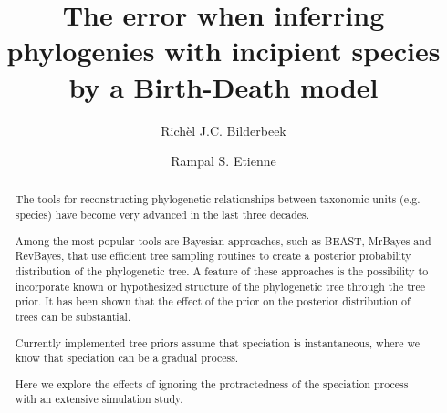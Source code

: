 \documentclass{article}
\title{The error when inferring phylogenies with incipient species by a Birth-Death model}
\author[1]{Rich\`el J.C. Bilderbeek}
\author[1]{Rampal S. Etienne}
\affil[1]{Groningen Institute for Evolutionary Life Sciences, University of Groningen, Groningen, The Netherlands}
\begin{document}
\maketitle

\begin{abstract}



  The tools for reconstructing phylogenetic relationships between taxonomic 
  units (e.g. species) have become very advanced in the last three decades. 

  Among the most popular tools are Bayesian approaches, such as BEAST, MrBayes and RevBayes, 
  that use efficient tree sampling routines to create a posterior probability distribution 
  of the phylogenetic tree. 
  A feature of these approaches is the possibility to incorporate 
  known or hypothesized structure of the phylogenetic tree through the tree prior. 
  It has been shown that the effect of the prior on the posterior distribution 
  of trees can be substantial. 

  Currently implemented tree priors assume that speciation is instantaneous,
  where we know that speciation can be a gradual process.

  Here we explore the effects of ignoring 
  the protractedness of the speciation process with an extensive simulation study. 






\end{abstract}
\end{document}

